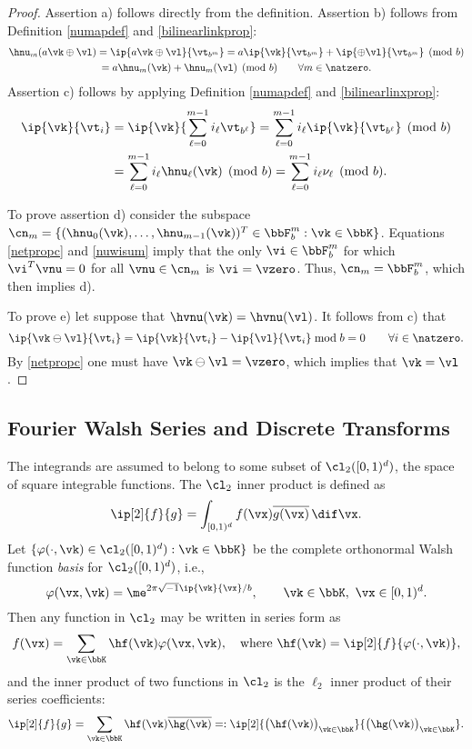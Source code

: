 \documentclass[]{elsarticle}
\theoremstyle{definition}
\newcommand{\cube}{[0,1)^d}
\begin{document}
\begin{proof} Assertion a) follows directly from the definition.  Assertion b) follows from Definition \ref{numapdef} and \eqref{bilinearlinkprop}:
\begin{multline*}
\hnu_m(a\vk \oplus \vl)= \ip{a\vk \oplus \vl}{\vt_{b^m}} = a\ip{\vk}{\vt_{b^m}} + \ip{\oplus \vl}{\vt_{b^m}} \pmod b \\
= a\hnu_m(\vk) + \hnu_m(\vl) \pmod b \qquad \forall m \in \natzero.
\end{multline*}
Assertion c) follows by applying  Definition \ref{numapdef} and \eqref{bilinearlinxprop}:
\begin{align*}
\ip{\vk}{\vt_i} &= \ip{\vk}{\sum_{\ell=0}^{m-1} i_\ell \vt_{b^{\ell}}} = \sum_{\ell=0}^{m-1} i_\ell \ip{\vk}{\vt_{b^{\ell}}} \pmod b \\
& = \sum_{\ell=0}^{m-1} i_\ell \hnu_\ell(\vk) \pmod b = \sum_{\ell=0}^{m-1} i_\ell \nu_\ell \pmod b.
\end{align*}

To prove assertion d) consider the subspace
$\cn_m = \{(\hnu_0(\vk), \ldots,  \hnu_{m-1}(\vk))^T \in \bbF_b^m : \vk \in \bbK\}$.
Equations \eqref{netpropc} and \eqref{nuwisum} imply that the only $\vi \in \bbF_b^m$ for which $\vi^T\vnu=0$ for all $\vnu \in \cn_m$ is $\vi=\vzero$.  Thus, $\cn_m=\bbF_b^m$, which then implies d).

To prove e) let suppose that $\hvnu(\vk)=\hvnu(\vl)$.  It follows from c) that
\[
\ip{\vk\ominus\vl}{\vt_i} = \ip{\vk}{\vt_i} - \ip{\vl}{\vt_i} \bmod b = 0 \qquad \forall i\in \natzero.
\]
By \eqref{netpropc} one must have $\vk\ominus\vl=\vzero$, which implies that $\vk=\vl$.
\end{proof}

\subsection{Fourier Walsh Series and Discrete Transforms}

The integrands are assumed to belong to some subset of $\cl_2(\cube)$, the space of square integrable functions.  The $\cl_2$ inner product is defined as
\[
\ip[2]{f}{g} = \int_{\cube} f(\vx) \overline{g(\vx)} \, \dif \vx.
\]
Let $\{\varphi(\cdot,\vk) \in \cl_2(\cube) : \vk \in \bbK\}$ be the complete orthonormal Walsh function \emph{basis} for $\cl_2(\cube)$, i.e.,
\[
\varphi(\vx,\vk)  = \me^{2 \pi \sqrt{-1} \ip{\vk}{\vx}/b}, \qquad \vk \in \bbK, \ \vx \in \cube.
\]
Then any function in $\cl_2$ may be written in series form as
\begin{equation} \label{Fourierdef}
f(\vx) = \sum_{\vk \in \bbK} \hf(\vk) \varphi(\vx,\vk), \quad \text{where } \hf(\vk) = \ip[2]{f}{\varphi(\cdot,\vk)},
\end{equation}
and the inner product of two functions in $\cl_2$ is the $\ell_2$ inner product of their series coefficients:
\[
\ip[2]{f}{g} = \sum_{\vk \in \bbK} \hf(\vk)\overline{\hg(\vk)} =: \ip[2]{\bigl(\hf(\vk)\bigr)_{\vk \in \bbK}}{\bigl ( \hg(\vk)\bigr )_{\vk \in \bbK}}.
\]
\end{document}
